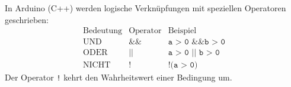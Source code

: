 \begin{myexercise}
    \begin{myremark}
        In Arduino (C++) werden logische Verknüpfungen mit speziellen Operatoren geschrieben:
        \[
            \begin{array}{c|c|c}
                \text{Bedeutung} & \text{Operator} & \text{Beispiel}           \\ \hline
                \text{UND}       & \texttt{\&\&}   & \texttt{a > 0 \&\& b > 0} \\
                \text{ODER}      & \texttt{||}     & \texttt{a > 0 || b > 0}   \\
                \text{NICHT}     & \texttt{!}      & \texttt{!(a > 0)}
            \end{array}
        \]
        Der Operator \texttt{!} kehrt den Wahrheitswert einer Bedingung um.

    \end{myremark}



\end{myexercise}




